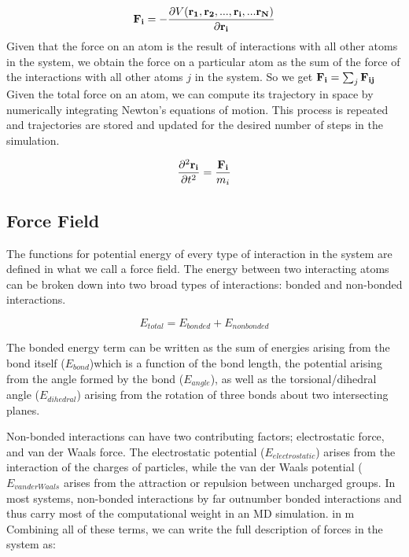 \begin{equation}
\mathbf{F_i}  = -\frac{\partial V(\mathbf{r_1}, \mathbf{r_2}, ..., \mathbf{r_i}, ... \mathbf{r_N)}}{\partial \mathbf{r_i}} 
 \end{equation}
 Given that the force on an atom is the result of interactions with all other atoms in the system, we obtain the force on a particular atom as the sum of the force of the interactions with all other atoms $j$ in the system. So we get $\mathbf{F_i} = \sum_{j} \mathbf{F_{ij}}$ Given the total force on an atom, we can compute its trajectory in space by numerically integrating Newton's equations of motion. This process is repeated and trajectories are stored and updated for the desired number of steps in the simulation.
 
 \begin{equation}
 \frac{\partial^2 \mathbf{r_{i}}}{\partial t^2} = \frac{\mathbf{F_i}}{m_i}
\end{equation}

\subsection{Force Field}

The functions for potential energy of every type of interaction in the system are defined in what we call a force field. The energy between two interacting atoms can be broken down into two broad types of interactions: bonded and non-bonded interactions.

\begin{equation}
E_{total} = E_{bonded} + E_{non bonded}
\end{equation}

The bonded energy term can be written as the sum of energies arising from the bond itself  ($E_{bond}$)which is a function of the bond length, the potential arising from the angle formed by the bond ($E_{angle}$), as well as the torsional/dihedral angle ($E_{dihedral}$) arising from the rotation of three bonds about two intersecting planes.

Non-bonded interactions can have two contributing factors; electrostatic force, and van der Waals force. The electrostatic potential ($E_{electrostatic}$) arises from the interaction of the charges of particles, while the van der Waals potential  ($E_{van der Waals}$ arises from the attraction or repulsion between uncharged groups. In most systems, non-bonded interactions by far outnumber bonded interactions and thus carry most of the computational weight in an MD simulation. in m Combining all of these terms, we can write the full description of forces in the system as:

